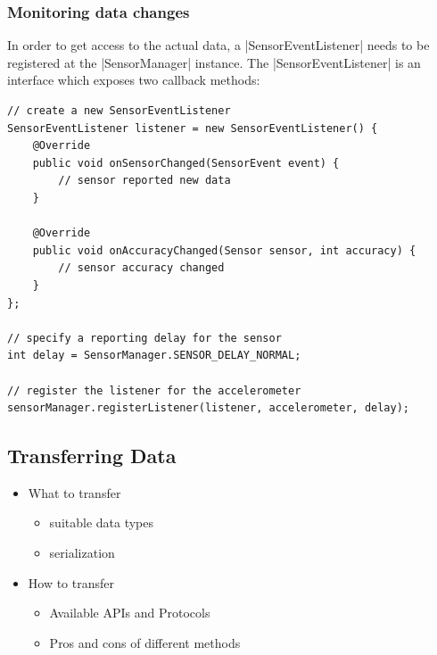 \subsubsection{Monitoring data changes}
In order to get access to the actual data, a |SensorEventListener|\cite{androiddocs:sensoreventlistener} needs to be registered at the |SensorManager| instance. The |SensorEventListener| is an interface which exposes two callback methods:

\begin{lstlisting}[label=registersensoreventlistener]
// create a new SensorEventListener
SensorEventListener listener = new SensorEventListener() {
	@Override
	public void onSensorChanged(SensorEvent event) {
		// sensor reported new data
	}

	@Override
	public void onAccuracyChanged(Sensor sensor, int accuracy) {
		// sensor accuracy changed
	}
};

// specify a reporting delay for the sensor
int delay = SensorManager.SENSOR_DELAY_NORMAL;

// register the listener for the accelerometer
sensorManager.registerListener(listener, accelerometer, delay);
\end{lstlisting}

\lipsum[1]
\lipsum[2]
\lipsum[3]
\lipsum[4]
\lipsum[5]
\lipsum[1]
\lipsum[2]
\lipsum[3]
\lipsum[4]
\lipsum[5]

\subsection{Transferring Data}
\begin{itemize}[noitemsep]
	\item What to transfer
		\begin{itemize}
			\item suitable data types
			\item serialization
		\end{itemize}
	\item How to transfer
		\begin{itemize}
			\item Available APIs and Protocols
			\item Pros and cons of different methods
		\end{itemize}
\end{itemize}
\lipsum[1]
\lipsum[2]
\lipsum[3]
\lipsum[4]
\lipsum[5]
\lipsum[1]
\lipsum[2]
\lipsum[3]
\lipsum[4]
\lipsum[5]
\lipsum[2]
\lipsum[3]
\lipsum[4]
\lipsum[5]


\clearpage